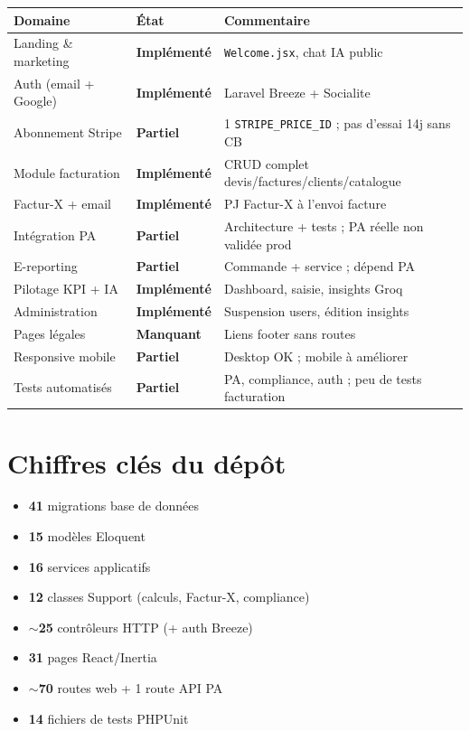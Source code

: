 \documentclass[11pt,a4paper]{report}
\newcommand{\filepath}[1]{\texttt{\small #1}}
\newcommand{\statusok}{\textcolor{copifiemerald}{\textbf{Implémenté}}}
\newcommand{\statuspartial}{\textcolor{copifiwarn}{\textbf{Partiel}}}
\newcommand{\statusgap}{\textcolor{copifidanger}{\textbf{Manquant}}}
\begin{document}
\begin{center}
\begin{tabular}{@{}p{5.5cm}p{2.2cm}p{6.8cm}@{}}
\toprule
\textbf{Domaine} & \textbf{État} & \textbf{Commentaire} \\
\midrule
Landing \& marketing & \statusok & \filepath{Welcome.jsx}, chat IA public \\
Auth (email + Google) & \statusok & Laravel Breeze + Socialite \\
Abonnement Stripe & \statuspartial & 1 \texttt{STRIPE\_PRICE\_ID} ; pas d'essai 14j sans CB \\
Module facturation & \statusok & CRUD complet devis/factures/clients/catalogue \\
Factur-X + email & \statusok & PJ Factur-X à l'envoi facture \\
Intégration PA & \statuspartial & Architecture + tests ; PA réelle non validée prod \\
E-reporting & \statuspartial & Commande + service ; dépend PA \\
Pilotage KPI + IA & \statusok & Dashboard, saisie, insights Groq \\
Administration & \statusok & Suspension users, édition insights \\
Pages légales & \statusgap & Liens footer sans routes \\
Responsive mobile & \statuspartial & Desktop OK ; mobile à améliorer \\
Tests automatisés & \statuspartial & PA, compliance, auth ; peu de tests facturation \\
\bottomrule
\end{tabular}
\end{center}

\section{Chiffres clés du dépôt}

\begin{itemize}[leftmargin=1.5em]
    \item \textbf{41} migrations base de données
    \item \textbf{15} modèles Eloquent
    \item \textbf{16} services applicatifs
    \item \textbf{12} classes Support (calculs, Factur-X, compliance)
    \item \textbf{$\sim$25} contrôleurs HTTP (+ auth Breeze)
    \item \textbf{31} pages React/Inertia
    \item \textbf{$\sim$70} routes web + 1 route API PA
    \item \textbf{14} fichiers de tests PHPUnit
\end{itemize}
\end{document}
